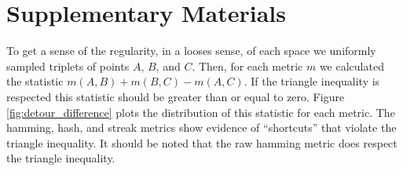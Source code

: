 \section{Supplementary Materials}



























To get a sense of the regularity, in a looses sense, of each space we uniformly sampled triplets of points $A$, $B$, and $C$.
Then, for each metric $m$ we calculated the statistic $m(A, B) + m(B, C) - m(A, C)$.
If the triangle inequality is respected this statistic should be greater than or equal to zero.
Figure \ref{fig:detour_difference} plots the distribution of this statistic for each metric.
The hamming, hash, and streak metrics show evidence of ``shortcuts'' that violate the triangle inequality.
It should be noted that the raw hamming metric does respect the triangle inequality.


